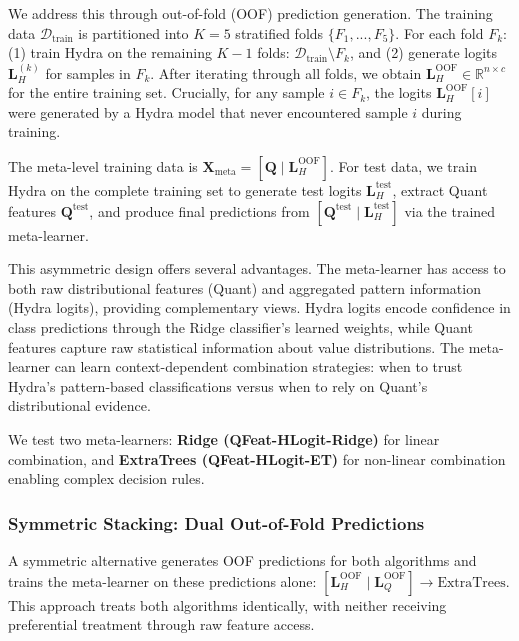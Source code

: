 \documentclass[pdflatex,sn-basic]{sn-jnl}           %
\theoremstyle{thmstyleone}%
\theoremstyle{thmstyletwo}%
\theoremstyle{thmstylethree}%
\begin{document}
We address this through out-of-fold (OOF) prediction generation. The training data $\mathcal{D}_{\text{train}}$ is partitioned into $K=5$ stratified folds $\{F_1, ..., F_5\}$. For each fold $F_k$: (1) train Hydra on the remaining $K-1$ folds: $\mathcal{D}_{\text{train}} \setminus F_k$, and (2) generate logits $\mathbf{L}_H^{(k)}$ for samples in $F_k$. After iterating through all folds, we obtain $\mathbf{L}_H^{\text{OOF}} \in \mathbb{R}^{n \times c}$ for the entire training set. Crucially, for any sample $i \in F_k$, the logits $\mathbf{L}_H^{\text{OOF}}[i]$ were generated by a Hydra model that never encountered sample $i$ during training.

The meta-level training data is $\mathbf{X}_{\text{meta}} = [\mathbf{Q} \mid \mathbf{L}_H^{\text{OOF}}]$. For test data, we train Hydra on the complete training set to generate test logits $\mathbf{L}_H^{\text{test}}$, extract Quant features $\mathbf{Q}^{\text{test}}$, and produce final predictions from $[\mathbf{Q}^{\text{test}} \mid \mathbf{L}_H^{\text{test}}]$ via the trained meta-learner.

This asymmetric design offers several advantages. The meta-learner has access to both raw distributional features (Quant) and aggregated pattern information (Hydra logits), providing complementary views. Hydra logits encode confidence in class predictions through the Ridge classifier's learned weights, while Quant features capture raw statistical information about value distributions. The meta-learner can learn context-dependent combination strategies: when to trust Hydra's pattern-based classifications versus when to rely on Quant's distributional evidence.

We test two meta-learners: \textbf{Ridge (QFeat-HLogit-Ridge)} for linear combination, and \textbf{ExtraTrees (QFeat-HLogit-ET)} for non-linear combination enabling complex decision rules.

\subsubsection{Symmetric Stacking: Dual Out-of-Fold Predictions}

A symmetric alternative generates OOF predictions for both algorithms and trains the meta-learner on these predictions alone: $[\mathbf{L}_H^{\text{OOF}} \mid \mathbf{L}_Q^{\text{OOF}}] \rightarrow \text{ExtraTrees}$. This approach treats both algorithms identically, with neither receiving preferential treatment through raw feature access.
\end{document}
